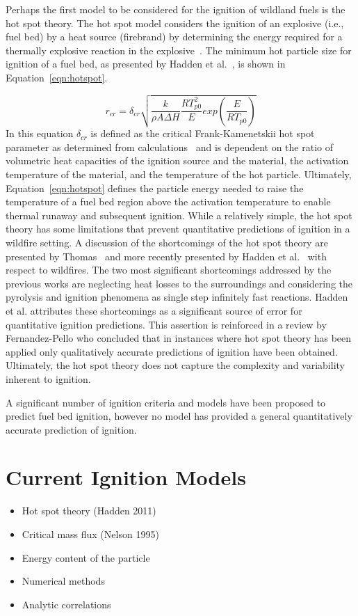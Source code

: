     Perhaps the first model to be considered for the ignition of wildland fuels is the hot spot theory. The hot spot model considers the ignition of an explosive (i.e., fuel bed) by a heat source (firebrand) by determining the energy required for a thermally explosive reaction in the explosive~\cite{Zinn1962InitiationSpots, Thomas1965}. The minimum hot particle size for ignition of a fuel bed, as presented by Hadden et al.~\cite{Hadden2011}, is shown in Equation~\ref{eqn:hotspot}.
    
        \begin{equation}
            r_{cr} = \delta_{cr}\sqrt{\frac{k}{\rho A \Delta H}\frac{RT^{2}_{p0}}{E} exp\left(\frac{E}{RT_{p0}} \right)}
            \label{eqn:hotspot}
        \end{equation}
    In this equation $\delta_{cr}$ is defined as the critical Frank-Kamenetskii hot spot parameter as determined from calculations~\cite{Goldshlager} and is dependent on the ratio of volumetric heat capacities of the ignition source and the material, the activation temperature of the material, and the temperature of the hot particle. Ultimately, Equation~\ref{eqn:hotspot} defines the particle energy needed to raise the temperature of a fuel bed region above the activation temperature to enable thermal runaway and subsequent ignition. While a relatively simple, the hot spot theory has some limitations that prevent quantitative predictions of ignition in a wildfire setting. A discussion of the shortcomings of the hot spot theory are presented by Thomas~\cite{Thomas1965} and more recently presented by Hadden et al.~\cite{Hadden2011} with respect to wildfires. The two most significant shortcomings addressed by the previous works are neglecting heat losses to the surroundings and considering the pyrolysis and ignition phenomena as single step infinitely fast reactions. Hadden et al. attributes these shortcomings as a significant source of error for quantitative ignition predictions. This assertion is reinforced in a review by Fernandez-Pello who concluded that in instances where hot spot theory has been applied only qualitatively accurate predictions of ignition have been obtained. Ultimately, the hot spot theory does not capture the complexity and variability inherent to ignition. 
    
    
    A significant number of ignition criteria and models have been proposed to predict fuel bed ignition, however no model has provided a general quantitatively accurate prediction of ignition. 
    \section{Current Ignition Models}
        \begin{itemize}
            \item Hot spot theory (Hadden 2011)
            \item Critical mass flux (Nelson 1995)
            \item Energy content of the particle
            \item Numerical methods
            \item Analytic correlations
        \end{itemize}
    
